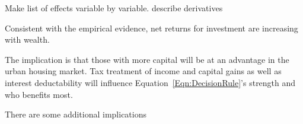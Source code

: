  Make list of effects variable by variable. describe derivatives
 
Consistent with the empirical evidence, net returns for investment are increasing with wealth. 
%
%
%
%

The implication is that those with more capital will be at an advantage in the urban housing  market. Tax treatment of income and capital gains as well as interest deductability will influence Equation~\ref{Eqn:DecisionRule}'s strength and who benefits most. 

There are some additional implications


